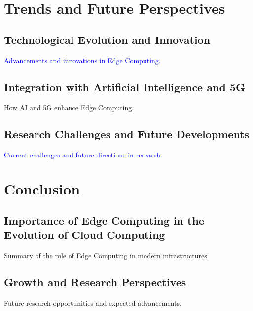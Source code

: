 \documentclass[runningheads]{llncs}
\begin{document}
\section{Trends and Future Perspectives}
\subsection{Technological Evolution and Innovation}
\textcolor{blue}{Advancements and innovations in Edge Computing.}

\subsection{Integration with Artificial Intelligence and 5G}
How AI and 5G enhance Edge Computing.

\subsection{Research Challenges and Future Developments}
\textcolor{blue}{Current challenges and future directions in research.}

\section{Conclusion}
\subsection{Importance of Edge Computing in the Evolution of Cloud Computing}
Summary of the role of Edge Computing in modern infrastructures.

\subsection{Growth and Research Perspectives}
Future research opportunities and expected advancements.
\end{document}
